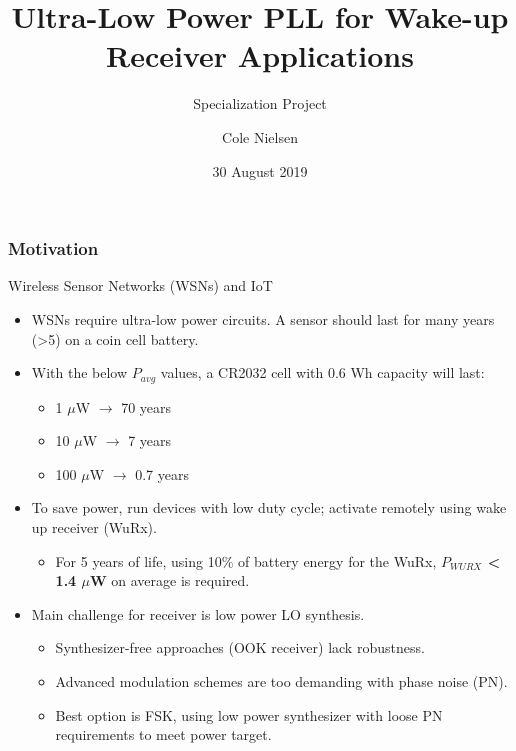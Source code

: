 \documentclass[t, screen, aspectratio=43]{beamer}
\title[Short title]{Ultra-Low Power PLL for Wake-up Receiver Applications}
\subtitle{Specialization Project}
\author[C Nielsen]{Cole Nielsen}
\institute[NTNU]{Department of Electronic Systems, NTNU}
\date{30 August 2019}
\begin{document}
\begin{frame}
	\titlepage%
\end{frame}



\begin{frame}
	\frametitle{Motivation}
	\begin{block}{Wireless Sensor Networks (WSNs) and IoT}
		\begin{itemize}
			\footnotesize
			\item WSNs require ultra-low power circuits. A sensor should last for many years (>5) on a coin cell battery.
			\item With the below $P_{avg}$ values, a CR2032 cell with 0.6 Wh capacity will last:
			\begin{itemize}
				\scriptsize
				\item 1 $\mu$W $\rightarrow$ 70 years
				\item 10 $\mu$W $\rightarrow$ 7 years
				\item 100 $\mu$W $\rightarrow$ 0.7 years
			\end{itemize} 
			\item To save power, run devices with low duty cycle; activate remotely using wake up receiver (WuRx).
			\begin{itemize}
				\scriptsize
				\item For 5 years of life, using 10\% of battery energy for the WuRx, \textbf{$P_{WURX}$ < 1.4 $\mu$W} on average is required.
			\end{itemize} 
			\item Main challenge for receiver is low power LO synthesis.
			\begin{itemize}
				\scriptsize
				\item Synthesizer-free approaches (OOK receiver) lack robustness.
				\item Advanced modulation schemes are too demanding with phase noise (PN).
				\item Best option is FSK, using low power synthesizer with loose PN requirements to meet power target.
			\end{itemize} 
		\end{itemize}    
	\end{block}
\end{frame}
\end{document}
